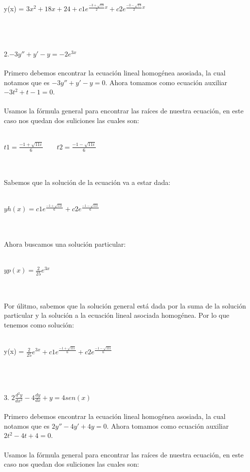 \documentclass[a4paper,10pt]{article}
\begin{document}
\centerline{y(x) = $3x^2 +18x +24 + c1 e^{\frac{-3+  \sqrt{13}}{2}x} +   c2 e^{\frac{-3-\sqrt{13}}{2}x}$}\\\\\\
2.$-3y'' + y' -y = -2e^{3x}$\\\\
Primero debemos encontrar la ecuación lineal homogénea asosiada, la cual notamos que es $-3y'' + y' - y=0 $. Ahora tomamos como ecuación auxiliar $-3t^2 + t - 1 =0$.\\\\
Usamos la fórmula general para encontrar las raíces de nuestra ecuación, en este caso nos quedan dos suliciones las cuales son:\\\\
\centerline{$t1= \frac{-1+  \sqrt{11 i}}{6} \quad\quad t2=\frac{-1-\sqrt{11i}}{6}$ }\\\\
Sabemos que la solución de la ecuación va a estar dada:\\\\
\centerline{$yh(x)= c1e^{\frac{-1+  \sqrt{11 i}}{6}}+c2e^{\frac{-1-\sqrt{11i}}{6}}$}\\\\
Ahora buscamos una solución particular:\\\\
\centerline{$yp(x)= \frac{2}{25} e^{3x}$ }\\\\
Por úlitmo, sabemos que la solución general está dada por la suma de la solución particular y la solución a la ecuación lineal asociada homogénea. Por lo que tenemos como solución:\\\\
\centerline{y(x) = $ \frac{2}{25} e^{3x} + c1e^{\frac{-1+  \sqrt{11 i}}{6}}+c2e^{\frac{-1-\sqrt{11i}}{6}}$}\\\\\\
3. $ 2\frac{d^2 y}{dx^2} - 4\frac{dy}{dx} + y = 4sen(x) $ \\\\
Primero debemos encontrar la ecuación lineal homogénea asosiada, la cual notamos que es $2y'' - 4y' + 4 y=0 $. Ahora tomamos como ecuación auxiliar $2t^2 - 4t + 4 =0$.\\\\
Usamos la fórmula general para encontrar las raíces de nuestra ecuación, en este caso nos quedan dos suliciones las cuales son:\\\\
\end{document}
